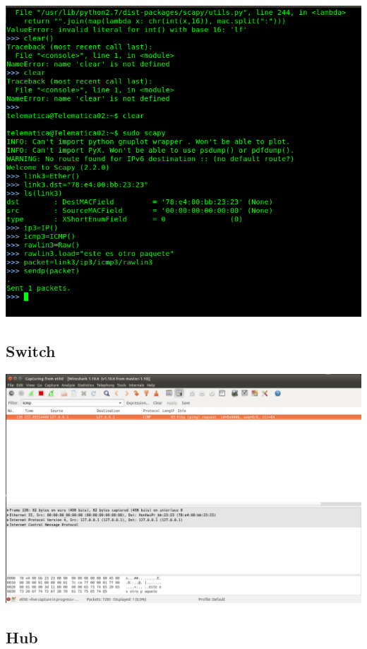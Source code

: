 \documentclass[spanish]{udpreport}
\begin{document}
\begin{center}
	\includegraphics[scale=.37]{imagenes/Switch/Test_3.png}
\end{center}


\newpage
\subsection{Switch}

\begin{center}
	\includegraphics[scale=.37]{imagenes/Switch/Test_3_Wireshark.png}
\end{center}




\subsection{Hub}
\end{document}
